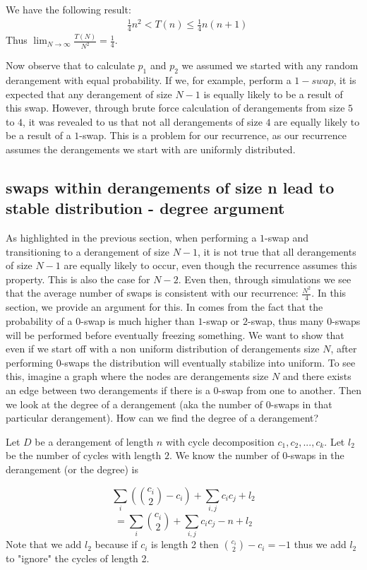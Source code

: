 \documentclass{article}
\begin{document}
We have the following result:
\begin{align}
    &  \frac{1}{4}n^2 < T(n) \leq \frac{1}{4}n(n + 1)
\end{align}
Thus $\lim_{N \to \infty} \frac{T(N)}{N^2} = \frac{1}{4}$.

Now observe that to calculate $p_1$ and $p_2$ we assumed we started with any random derangement
with equal probability. If we, for example, perform a $1-swap$, it is expected that any 
derangement of size $N - 1$ is equally likely to be a result of this swap. However,
through brute force calculation of derangements from size $5$ to $4$, it was revealed to us that
not all derangements of size $4$ are equally likely to be a result of a $1$-swap. This is a 
problem for our recurrence, as our recurrence assumes the derangements we start with are
uniformly distributed.

\subsection{swaps within derangements of size n lead to stable distribution - degree argument}
As highlighted in the previous section, when performing a $1$-swap and transitioning to a 
derangement of size $N - 1$, it is not true that all derangements of size $N - 1$ are
equally likely to occur, even though the recurrence assumes this property. This is
also the case for $N - 2$. Even then, through simulations we see that the average
number of swaps is consistent with our recurrence: $\frac{N^2}{4}$. In this section, we provide an argument for this.
In comes from the fact that the probability of a $0$-swap is much higher than $1$-swap or $2$-swap, thus
many $0$-swaps will be performed before eventually freezing something. We want to show that even if we start
off with a non uniform distribution of derangements size $N$, after performing $0$-swaps the distribution
will eventually stabilize into uniform. To see this, imagine a graph where the nodes are derangements
size $N$ and there exists an edge between two derangements if there is a $0$-swap from one to another.
Then we look at the degree of a derangement (aka the number of $0$-swaps in that particular derangement).
How can we find the degree of a derangement?

Let $D$ be a derangement of length $n$ with cycle decomposition $c_1, c_2, ..., c_k$.
Let $l_2$ be the number of cycles with length $2$.
We know the number of $0$-swaps in the derangement (or the degree) is

\[
    \sum_{i}{({c_i \choose 2} - c_i)} + \sum_{i, j}{{c_i}{c_j}} + l_2 
\]
\[
    = \sum_{i}{c_i \choose 2} + \sum_{i, j}{{c_i}{c_j}} - n + l_2 
\]
Note that we add $l_2$ because if $c_i$ is length 2 then 
$ {c_i \choose 2} - c_i = -1 $ thus we add $l_2$ to "ignore" the cycles of length 2.
\end{document}
